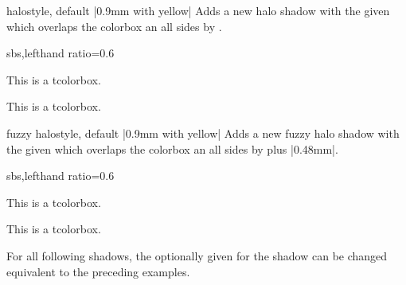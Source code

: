 \begin{docTcbKey}{halo}{}{style, default |0.9mm with yellow|}
  Adds a new halo shadow with the given 
  which overlaps the colorbox an all sides by .
\begin{dispExample*}{sbs,lefthand ratio=0.6}

\begin{tcolorbox}[title=My own halo,halo]
This is a tcolorbox.
\end{tcolorbox}
\par\bigskip\bigskip
\begin{tcolorbox}[title=Another halo,
  halo=2mm with green]
This is a tcolorbox.
\end{tcolorbox}
\end{dispExample*}
\end{docTcbKey}

\enlargethispage*{2cm}
\begin{docTcbKey}{fuzzy halo}{}{style, default |0.9mm with yellow|}
  Adds a new fuzzy halo shadow with the given 
  which overlaps the colorbox an all sides by  plus |0.48mm|.
\begin{dispExample*}{sbs,lefthand ratio=0.6}

\begin{tcolorbox}[title=My own halo,fuzzy halo]
This is a tcolorbox.
\end{tcolorbox}
\par\bigskip\bigskip
\begin{tcolorbox}[title=Another halo,
  fuzzy halo=2mm with green]
This is a tcolorbox.
\end{tcolorbox}
\end{dispExample*}

\begin{dispExample}
\begin{tcolorbox}[blank,enhanced jigsaw,boxsep=2pt,arc=2pt,
  fuzzy halo=2mm with red!50!white,
  fuzzy halo=1mm with white]
\lipsum[1]
\end{tcolorbox}
\end{dispExample}
\end{docTcbKey}


\clearpage
For all following shadows, the optionally given  for the shadow can be changed
equivalent to the preceding examples.


